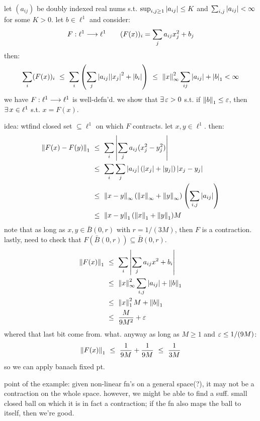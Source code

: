 \begin{xmp}[source=Primary Source Material]
	let $(a_{ij})$ be doubly indexed real nums s.t.
	$\sup_{i,j\geq1}\abs{a_{ij}}\leq K$ and $\sum_{i,j}\abs{a_{ij}}<\infty$
	for some $K>0$. let $b\in\ell^{1}$ and consider:
	\begin{equation*}
		F:\ell^{1}\longrightarrow \ell^{1} \qquad (F(x))_{i}=\sum_{j}a_{ij}x_{j}^{2}+b_{j}
	\end{equation*}
	then:
	\begin{equation*}
		\sum_{i}(F(x))_{i}
		\ \leq \ \sum_{i}\left(\sum_{j}\abs{a_{ij}}\abs{x_{j}}^{2}+\abs{b_{i}}\right)
		\ \leq \ \norm{x}_{\infty}^{2}\sum_{ij}\abs{a_{ij}}+\abs{b}_{1}<\infty
	\end{equation*}
	we have $F:\ell^{1}\longrightarrow\ell^{1}$ is well-defn'd.
	we show that $\ex\ep>0$ s.t. if $\left\|b\right\|_{1}\leq\varepsilon$, then
	$\ex x\in\ell^{1}$ s.t. $x=F(x)$.

	idea: wtfind closed set $\subseteq\ell^{1}$ on which $F$ contracts.
	let $x,y\in\ell^{1}$. then:
	\begin{align*}
		\norm{F(x)-F(y)}_{1}
		& \ \leq \ \sum_{i}\abs{\sum_{j}a_{ij}(x_{j}^{2}-y_{j}^{2})} \\
		& \ \leq \ \sum_{i}\sum_{j}\abs{a_{ij}}\left(\abs{x_{j}}+\abs{y_{j}}\right)\abs{x_{j}-y_{j}} \\
		& \ \leq \ \norm{x-y}_{\infty}(\norm{x}_{\infty}+\norm{y}_{\infty})\left(\sum_{i,j}\abs{a_{ij}}\right) \\
		& \ \leq \ \norm{x-y}_{1}(\norm{x}_{1}+\norm{y}_{1})M
	\end{align*}
	note that as long as $x,y\in \bar{B}(0,r)$ with $r=1/(3M)$, then $F$ is a contraction.
	lastly, need to check that $F(\bar{B}(0,r))\subseteq\bar{B}(0,r)$.
	\begin{align*}
		\norm{F(x)}_{1}
		& \ \leq \ \sum_{i}\abs{\sum_{j}a_{ij}x^{2}+b_{i}} \\
		& \ \leq \ \norm{x}_{\infty}^{2}\sum_{i,j}\abs{a_{ij}}+\norm{b}_{1} \\
		& \ \leq \ \norm{x}_{1}^{2}M + \norm{b}_{1} \\
		& \ \leq \ \frac{M}{9M^{2}}+\ep
	\end{align*}
	whered that last bit come from. what.
	anyway as long as $M\geq1$ and $\varepsilon\leq1/(9M)$:
	\begin{equation*}
		\norm{F(x)}_{1} \ \leq \ \frac{1}{9M}+\frac{1}{9M} \ \leq \ \frac{1}{3M}
	\end{equation*}
	so we can apply banach fixed pt.
\end{xmp}
point of the example: given non-linear fn's on a general space(?), it
may not be a contraction on the whole space.
however, we might be able to find a suff. small closed ball on which it is
in fact a contraction; if the fn also maps the ball to itself, then we're good.




